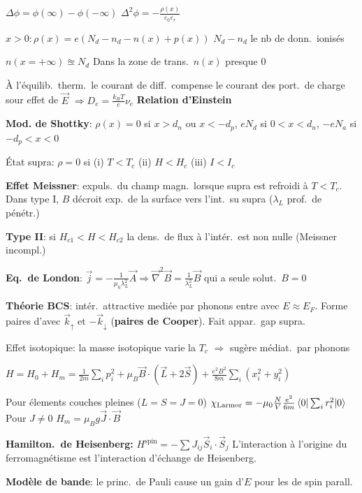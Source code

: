 \begin{squishlist}
    \item $\Delta \phi = \phi(\infty) - \phi(-\infty)$ \qquad $\Delta^2 \phi = - \frac{\rho(x)}{\varepsilon_0 \varepsilon_r}$
    \item $x>0 : \rho(x) = e (N_d - n_d - n(x) + p(x))$ \quad $N_d-n_d$ le nb de donn.\ ionisés
    \item $n(x=+\infty) \approxeq N_d$ \qquad Dans la zone de trans.\ $n(x)$ presque $0$
    \item À l'équilib.\ therm.\ le courant de diff.\ compense le courant des port.\ de charge sour effet de $\vec{E}$ $\Longrightarrow D_e = \frac{k_B T}{e} \nu_e$ \textbf{Relation d'Einstein}
    \item \textbf{Mod. de Shottky}: $\rho(x) = 0$ si $x>d_n$ ou $x < -d_p$, $eN_d$ si $0<x<d_n$, $-eN_a$ si $-d_p<x<0$
\end{squishlist}
\begin{squishlist}
    \item État supra: $\rho=0$ si (i) $T<T_c$ (ii) $H < H_c$ (iii) $I < I_c$
    \item \textbf{Effet Meissner}: expuls.\ du champ magn.\ lorsque supra est refroidi à $T<T_c$. \\
    Dans type I, $B$ décroit exp.\ de la surface vers l'int.\ su supra ($\lambda_L$ prof.\ de pénétr.)
    \item \textbf{Type II}: si $H_{c1}<H<H_{c2}$ la dens.\ de flux à l'intér.\ est non nulle (Meissner incompl.)
    \item \textbf{Eq.\ de London}: $\vec{j} = - \frac{1}{\mu_0 \lambda_L^2} \vec{A} \Longrightarrow \vec{\nabla}^2 \vec{B} = \frac{1}{\lambda_L^2}\vec{B}$ qui a seule solut.\ $B=0$
    \item \textbf{Théorie BCS}: intér.\ attractive mediée par phonons entre \elec avec $E\approx E_F$. Forme paires d'\elec avec $\vec{k}_{\uparrow}$ et $-\vec{k}_{\downarrow}$ (\textbf{paires de Cooper}). Fait appar.\ gap supra.
    \item Effet isotopique: la masse isotopique varie la $T_c$ $\Rightarrow$ sugère médiat.\ par phonons
\end{squishlist}

\begin{squishlist}
    \item $H = H_0 + H_m = \frac{1}{2m}\sum_i p_i^2 + \mu_B \vec{B} \cdot (\vec{L}+ 2 \vec{S}) + \frac{e^2 B^2}{8m} \sum_i (x_i^2 + y_i^2)$
    \item Pour élements couches pleines ($L=S=J=0$) $\chi_{\text{Larmor}} = -\mu_0 \frac{N}{V} \frac{e^2}{6m} \braket{0|\sum_i r_i^2|0}$ \\
    Pour $J\neq0$ $H_m = \mu_B g \vec{J} \cdot \vec{B}$ 
    \item \textbf{Hamilton.\ de Heisenberg:} $H^{\text{spin}} = - \sum J_{ij} \vec{S}_i \cdot \vec{S}_j$  L’interaction à l’origine du ferromagnétisme est l’interaction d’échange de Heisenberg.
    \item \textbf{Modèle de bande}: le princ.\ de Pauli cause un gain d'$E$ pour les \elec de spin parall.\
\end{squishlist}

